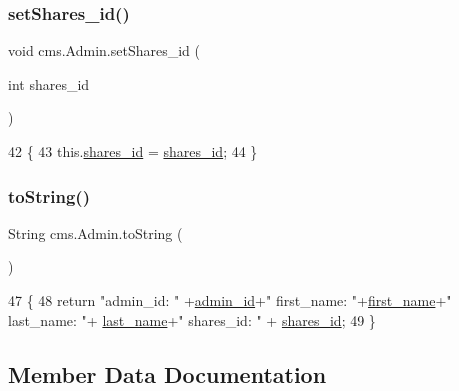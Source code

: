 \subsubsection{\texorpdfstring{set\+Shares\+\_\+id()}{setShares\_id()}}
{\footnotesize\ttfamily void cms.\+Admin.\+set\+Shares\+\_\+id (\begin{DoxyParamCaption}\item[{int}]{shares\+\_\+id }\end{DoxyParamCaption})\hspace{0.3cm}{\ttfamily [inline]}}


\begin{DoxyCode}
42                                             \{
43         this.\mbox{\hyperlink{classcms_1_1_admin_a1f31a081502c0d05fef837eb1b36b157}{shares\_id}} = \mbox{\hyperlink{classcms_1_1_admin_a1f31a081502c0d05fef837eb1b36b157}{shares\_id}};
44     \}
\end{DoxyCode}
\mbox{\label{classcms_1_1_admin_a826310023a7b65760ed8b708c6ce198c}} 
\subsubsection{\texorpdfstring{to\+String()}{toString()}}
{\footnotesize\ttfamily String cms.\+Admin.\+to\+String (\begin{DoxyParamCaption}{ }\end{DoxyParamCaption})\hspace{0.3cm}{\ttfamily [inline]}}


\begin{DoxyCode}
47                             \{
48         \textcolor{keywordflow}{return}  \textcolor{stringliteral}{"admin\_id: "} +\mbox{\hyperlink{classcms_1_1_admin_af3be9e8376e013a240ae51c28e7e8d6e}{admin\_id}}+\textcolor{stringliteral}{" first\_name: "}+\mbox{\hyperlink{classcms_1_1_admin_ad476f88383b7c36bfbd70be502be4202}{first\_name}}+\textcolor{stringliteral}{" last\_name: "}+
      \mbox{\hyperlink{classcms_1_1_admin_abe31ed0d83c09185e6e4f6c1a3d3c685}{last\_name}}+\textcolor{stringliteral}{" shares\_id: "} + \mbox{\hyperlink{classcms_1_1_admin_a1f31a081502c0d05fef837eb1b36b157}{shares\_id}};
49     \}
\end{DoxyCode}


\subsection{Member Data Documentation}
\mbox{\label{classcms_1_1_admin_af3be9e8376e013a240ae51c28e7e8d6e}} 
